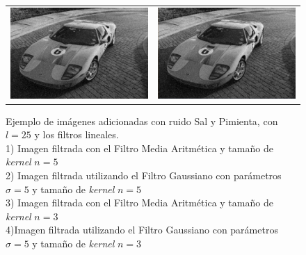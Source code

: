 \begin{landscape}
\begin{figure}[!h]
\begin{tabular}{cc}
				\includegraphics[width=12.25cm]{Imagenes/Ruido_sp_25_FMA_3.png} & \includegraphics[width=12.25cm]{Imagenes/Ruido_sp_25_Gauss_5_3.png}
			\end{tabular}
			\label{Ruido_SalPimienta_Filtros_lineales}
			\caption{Ejemplo de imágenes adicionadas con ruido Sal y Pimienta, con $l = 25$ y los filtros lineales. \\ 1) Imagen filtrada con el Filtro Media Aritmética y tamaño de \textit{kernel} $n = 5$ \\ 2) Imagen filtrada utilizando el Filtro Gaussiano con parámetros $\sigma = 5$ y tamaño de \textit{kernel} $n = 5$ \\ 3) Imagen filtrada con el Filtro Media Aritmética y tamaño de \textit{kernel} $n = 3$ \\ 4)Imagen filtrada utilizando el Filtro Gaussiano con parámetros $\sigma = 5$ y tamaño de \textit{kernel} $n = 3$}
		\end{figure}
	\end{landscape}

